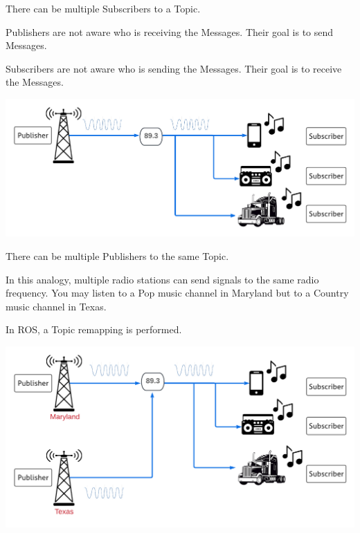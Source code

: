 \documentclass[usenames,11,dvipsnames,svgnames,x11names,aspectratio=1610,bibref]{beamer}
\newcommand{\iconColor}[1]{\textcolor{iconColor}{#1}}
\renewcommand\sec{{\cnordSix{\secname}\hfill\mydisclaimer} }
\newcommand{\mynote}{\iconColor{\faEdit}\xspace}
\begin{document}
\begin{frame}[fragile]{\sec}
\vspace*{\fill}
\begin{center} 
There can be multiple Subscribers to a Topic. 

\begin{compactitem}
\footnotesize
\item Publishers are not aware who is receiving the Messages. Their goal is to send Messages.
\item Subscribers are not aware who is sending the Messages. Their goal is to receive the Messages.
\end{compactitem}

\includegraphics[width=.7\linewidth]{figures/lecture2/analogy6.pdf}

\end{center}
\vspace*{\fill}
\end{frame}

 
\begin{frame}[fragile]{\sec}
\vspace*{\fill}
\begin{center} 
There can be multiple Publishers to the same Topic. 

\begin{compactitem}
\footnotesize

\item In this analogy, multiple radio stations can send signals to the same radio frequency. You may listen to a Pop music channel in Maryland but to a Country music channel in Texas.
\item \mynote In ROS, a Topic remapping is performed.
\end{compactitem}

\includegraphics[width=.7\linewidth]{figures/lecture2/analogy7.pdf}

\end{center}
\vspace*{\fill}
\end{frame}
\end{document}
